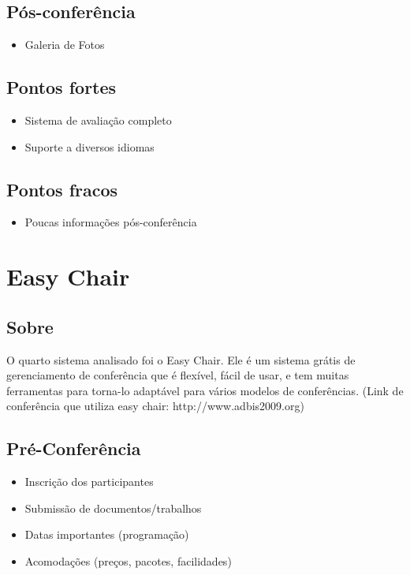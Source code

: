 \documentclass[letter]{article}
\begin{document}
\subsection{Pós-conferência}
\begin{itemize} 
\item Galeria de Fotos
\end{itemize}

\subsection{Pontos fortes}
\begin{itemize}
\item Sistema de avaliação completo
\item Suporte a diversos idiomas
\end{itemize}

\subsection{Pontos fracos}
\begin{itemize}
\item Poucas informações pós-conferência
\end{itemize}





\section{Easy Chair}
\subsection{Sobre}
O quarto sistema analisado foi o Easy Chair. Ele é um sistema grátis de gerenciamento de conferência que é flexível, fácil de usar, e tem muitas ferramentas para torna-lo adaptável para vários modelos de conferências. (Link de conferência que utiliza easy chair: http://www.adbis2009.org)


\subsection{Pré-Conferência}

\begin{itemize}
\item Inscrição dos participantes
\item Submissão de documentos/trabalhos
\item Datas importantes (programação)
\item Acomodações (preços, pacotes, facilidades)
\end{itemize}
\end{document}

